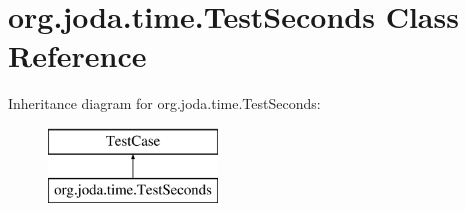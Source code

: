 \hypertarget{classorg_1_1joda_1_1time_1_1_test_seconds}{\section{org.\-joda.\-time.\-Test\-Seconds Class Reference}
\label{classorg_1_1joda_1_1time_1_1_test_seconds}
}
Inheritance diagram for org.\-joda.\-time.\-Test\-Seconds\-:\begin{figure}[H]
\begin{center}
\leavevmode
\includegraphics[height=2.000000cm]{classorg_1_1joda_1_1time_1_1_test_seconds}
\end{center}
\end{figure}
